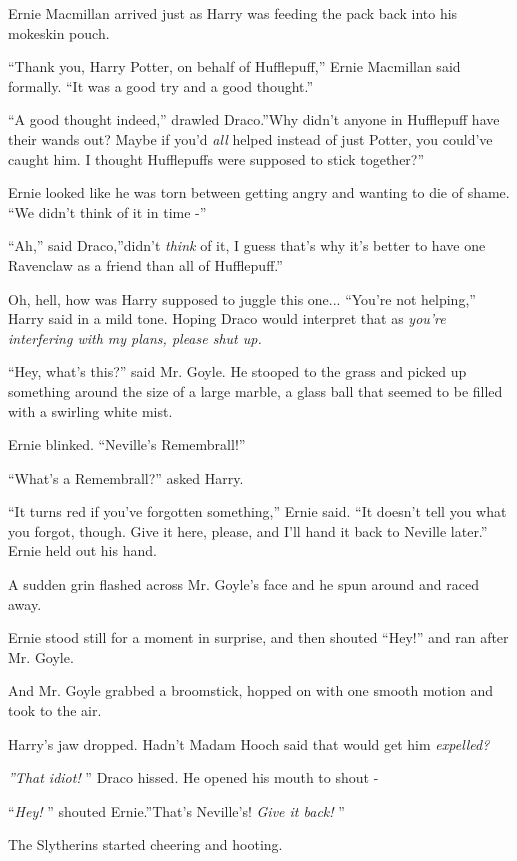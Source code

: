 Ernie Macmillan arrived just as Harry was feeding the pack back into his
mokeskin pouch.

``Thank you, Harry Potter, on behalf of Hufflepuff,'' Ernie Macmillan
said formally. ``It was a good try and a good thought.''

``A good thought indeed,'' drawled Draco.''Why didn't anyone in
Hufflepuff have their wands out? Maybe if you'd \emph{all} helped
instead of just Potter, you could've caught him. I thought Hufflepuffs
were supposed to stick together?''

Ernie looked like he was torn between getting angry and wanting to die
of shame. ``We didn't think of it in time -''

``Ah,'' said Draco,''didn't \emph{think} of it, I guess that's why it's
better to have one Ravenclaw as a friend than all of Hufflepuff.''

Oh, hell, how was Harry supposed to juggle this one... ``You're not
helping,'' Harry said in a mild tone. Hoping Draco would interpret that
as \emph{you're interfering with my plans, please shut up.}

``Hey, what's this?'' said Mr. Goyle. He stooped to the grass and picked
up something around the size of a large marble, a glass ball that seemed
to be filled with a swirling white mist.

Ernie blinked. ``Neville's Remembrall!''

``What's a Remembrall?'' asked Harry.

``It turns red if you've forgotten something,'' Ernie said. ``It doesn't
tell you what you forgot, though. Give it here, please, and I'll hand it
back to Neville later.'' Ernie held out his hand.

A sudden grin flashed across Mr. Goyle's face and he spun around and
raced away.

Ernie stood still for a moment in surprise, and then shouted ``Hey!''
and ran after Mr. Goyle.

And Mr. Goyle grabbed a broomstick, hopped on with one smooth motion and
took to the air.

Harry's jaw dropped. Hadn't Madam Hooch said that would get him
\emph{expelled?}

\emph{''That idiot!} '' Draco hissed. He opened his mouth to shout -

``\emph{Hey!} '' shouted Ernie.''That's Neville's! \emph{Give it back!} ''

The Slytherins started cheering and hooting.

